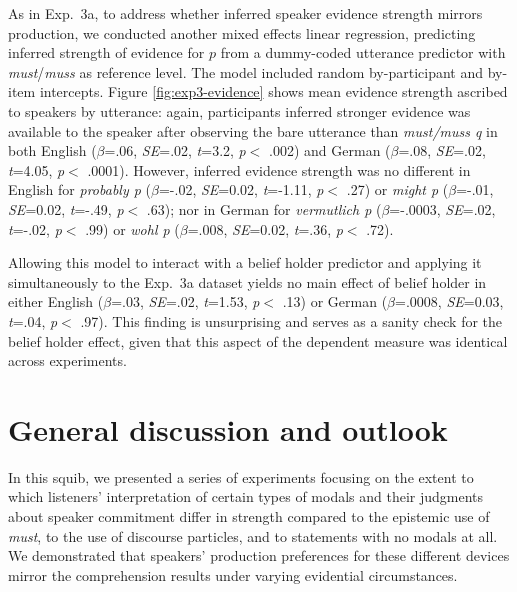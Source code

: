\documentclass[11pt]{article}
\newcommand{\figref}[1]{Figure \ref{#1}}
\begin{document}
As in Exp.~3a, to address whether inferred speaker evidence strength mirrors production, we conducted another mixed effects linear regression, predicting inferred strength of evidence for $p$ from a dummy-coded utterance predictor with \emph{must}/\emph{muss} as reference level. The model included random by-participant and by-item intercepts.  \figref{fig:exp3-evidence} shows mean evidence strength ascribed to speakers by utterance:  again, participants inferred stronger evidence was available to the speaker after observing the bare utterance than \emph{must/muss q} in both English ($\beta$=.06, \emph{SE}=.02, \emph{t}=3.2, \emph{p}$<$ .002) and German ($\beta$=.08, \emph{SE}=.02, \emph{t}=4.05, \emph{p}$<$ .0001). However, inferred evidence strength was no different in English for \emph{probably p} ($\beta$=-.02, \emph{SE}=0.02, \emph{t}=-1.11, \emph{p}$<$ .27) or \emph{might p} ($\beta$=-.01, \emph{SE}=0.02, \emph{t}=-.49, \emph{p}$<$ .63); nor in German for \emph{vermutlich p} ($\beta$=-.0003, \emph{SE}=.02, \emph{t}=-.02, \emph{p}$<$ .99) or \emph{wohl p} ($\beta$=.008, \emph{SE}=0.02, \emph{t}=.36, \emph{p}$<$ .72).

Allowing this model to interact with a belief holder predictor and applying it simultaneously to the Exp.~3a dataset yields no main effect of belief holder in either English ($\beta$=.03, \emph{SE}=.02, \emph{t}=1.53, \emph{p}$<$ .13) or German ($\beta$=.0008, \emph{SE}=0.03, \emph{t}=.04, \emph{p}$<$ .97). This finding is unsurprising and serves as a sanity check for the belief holder effect, given that this aspect of the dependent measure was identical across experiments.


\section{General discussion and outlook}

In this squib, we presented a series of experiments focusing on the extent to which listeners' interpretation of certain types of modals and their judgments about speaker commitment differ in strength compared to the epistemic use of \emph{must}, to the use of discourse particles, and to statements with no modals at all. We demonstrated that speakers' production preferences for these different devices mirror the comprehension results under varying evidential circumstances.
\end{document}
